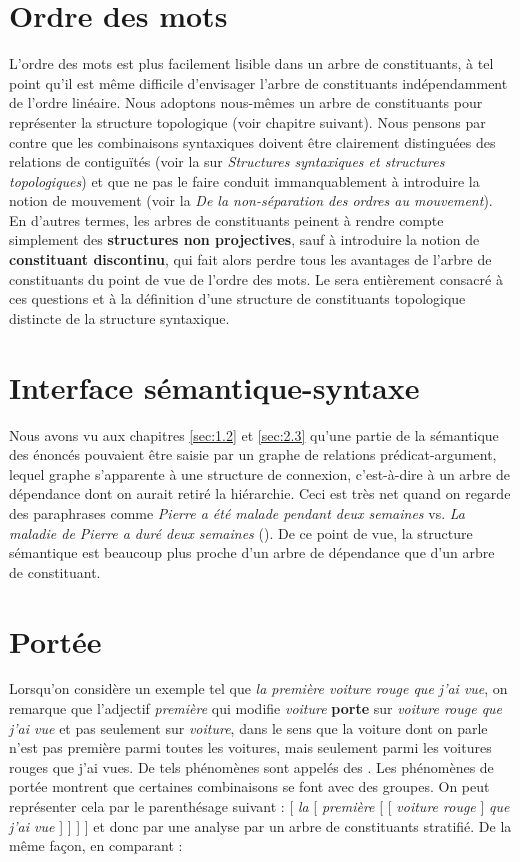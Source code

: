 {    \section*{Ordre des mots}

    L’ordre des mots est plus facilement lisible dans un arbre de constituants, à tel point qu’il est même difficile d’envisager l’arbre de constituants indépendamment de l’ordre linéaire. Nous adoptons nous-mêmes un arbre de constituants pour représenter la structure topologique (voir chapitre suivant). Nous pensons par contre que les combinaisons syntaxiques doivent être clairement distinguées des relations de contiguïtés (voir la  sur \textit{Structures syntaxiques et structures topologiques}) et que ne pas le faire conduit immanquablement à introduire la notion de mouvement (voir la  \textit{De la non-séparation des ordres au mouvement}). En d’autres termes, les arbres de constituants peinent à rendre compte simplement des \textbf{structures non projectives}, sauf à introduire la notion de \textbf{constituant discontinu}, qui fait alors perdre tous les avantages de l’arbre de constituants du point de vue de l’ordre des mots. Le  sera entièrement consacré à ces questions et à la définition d’une structure de constituants topologique distincte de la structure syntaxique.

    \section*{Interface sémantique-syntaxe}

    Nous avons vu aux chapitres \ref{sec:1.2} et \ref{sec:2.3} qu’une partie de la sémantique des énoncés pouvaient être saisie par un graphe de relations prédicat-argument, lequel graphe s’apparente à une structure de connexion, c’est-à-dire à un arbre de dépendance dont on aurait retiré la hiérarchie. Ceci est très net quand on regarde des paraphrases comme \textit{Pierre a été malade pendant deux semaines} vs. \textit{La maladie de Pierre a duré deux semaines} (). De ce point de vue, la structure sémantique est beaucoup plus proche d’un arbre de dépendance que d’un arbre de constituant.

    \section*{Portée}
    Lorsqu’on considère un exemple tel que \textit{la première voiture rouge que j’ai vue}, on remarque que l’adjectif \textit{première} qui modifie \textit{voiture} \textbf{porte} sur \textit{voiture rouge que j’ai vue} et pas seulement sur \textit{voiture}, dans le sens que la voiture dont on parle n’est pas première parmi toutes les voitures, mais seulement parmi les voitures rouges que j’ai vues. De tels phénomènes sont appelés des . Les phénomènes de portée montrent que certaines combinaisons se font avec des groupes. On peut représenter cela par le parenthésage suivant :
    \ea{}
    [ \textit{la} [ \textit{première} [ [ \textit{voiture rouge} ] \textit{que j’ai vue} ] ] ] ]
    \z
    et donc par une analyse par un arbre de constituants stratifié. De la même façon, en comparant :

}
